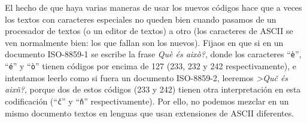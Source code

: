 El hecho de que haya varias maneras de usar los nuevos códigos hace que a veces los textos con caracteres especiales no queden bien cuando pasamos de un procesador de textos (o un editor de textos) a otro (los caracteres de ASCII se ven normalmente bien: los que fallan son los nuevos). Fijaos en que si en un documento ISO-8859-1 se escribe la frase \emph{Què és això?}, donde los caracteres ``\texttt{è}'', ``\texttt{é}'' y ``\texttt{ò}'' tienen códigos por encima de 127 (233, 232 y 242 respectivamente), e intentamos leerlo como si fuera un documento ISO-8859-2, leeremos \emph{>Quč és aixň?}, porque dos de estos códigos (233 y 242) tienen otra interpretación en esta codificación (``\texttt{č}'' y ``\texttt{ň}'' respectivamente). Por ello, no podemos mezclar en un mismo documento textos en lenguas que usan extensiones de ASCII diferentes. 

